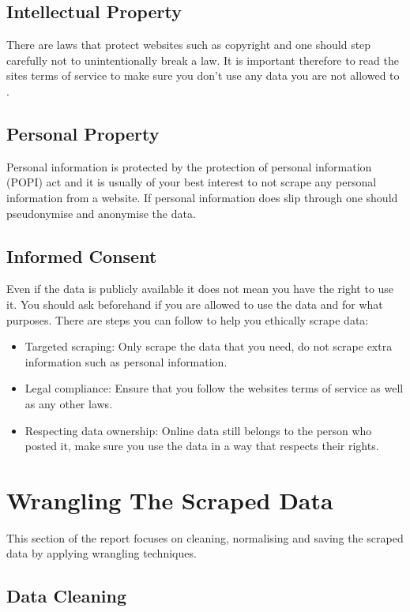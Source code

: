 \documentclass[10pt]{article}
\begin{document}
\subsection{Intellectual Property}

There are laws that protect websites such as copyright and one should step carefully not to unintentionally
break a law. It is important therefore to read the sites terms of service to make
sure you don't use any data you are not allowed to \cite{stackexchange-terms}.

\subsection{Personal Property}
Personal information is protected by the protection of personal information (POPI) act and it is usually of
your best interest to not scrape any personal information from a website. If personal information does slip
through one should pseudonymise and anonymise the data. 

\subsection{Informed Consent}

Even if the data is publicly available it does not mean you have the right to use it. You should ask
beforehand if you are allowed to use the data and for what purposes.
There are steps you can follow to help you ethically scrape data:
\begin{itemize}
    \item Targeted scraping: Only scrape the data that you need, do not scrape extra information such as personal information.
    \item Legal compliance: Ensure that you follow the websites terms of service as well as any other laws.
    \item Respecting data ownership: Online data still belongs to the person who posted it, make sure you use the data in a way that respects their rights.
\end{itemize}

\section{Wrangling The Scraped Data}

This section of the report focuses on cleaning, normalising and saving the scraped data
by applying wrangling techniques.

\subsection{Data Cleaning}
\end{document}
